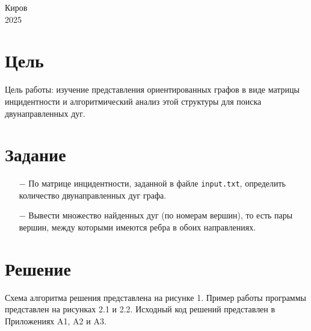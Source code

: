 \documentclass[oneside,a4paper,14pt]{extarticle}
\begin{document}
\begin{center}
	Киров\\
	2025
\end{center}

\newpage\thispagestyle{plain}

\section*{Цель}

Цель работы: изучение представления ориентированных графов в виде матрицы инцидентности и алгоритмический анализ этой структуры для поиска двунаправленных дуг.

\section*{Задание}
\begin{itemize}
	\item[$-$] По матрице инцидентности, заданной в файле \texttt{input.txt}, определить количество двунаправленных дуг графа.
	\item[$-$] Вывести множество найденных дуг (по номерам вершин), то есть пары вершин, между которыми имеются ребра в обоих направлениях.
\end{itemize}
\section*{Решение}

Схема алгоритма решения представлена на рисунке 1. Пример работы программы представлен на рисунках 2.1 и 2.2. Исходный код решений представлен в Приложениях A1, A2 и A3.
\end{document}
